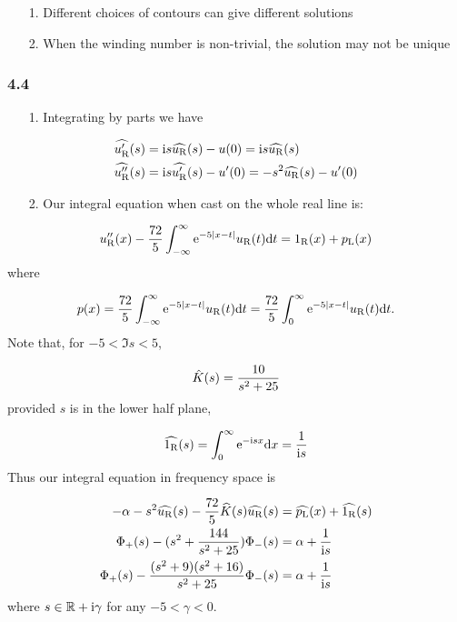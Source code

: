 \documentclass[12pt,a4paper]{article}
\def\D{ {\rm d} }
\def\I{ {\rm i} }
\def\E{ {\rm e} }
\def\R{ {\mathbb R} }
\def\dx{\D x}
\def\dt{\D t}
\def\rR{ {\rm R} }
\def\rL{ {\rm L} }
\begin{document}
\begin{itemize}
\item[1. ] Different choices of contours can give different solutions


\item[2. ] When the winding number is non-trivial, the solution may not be unique

\end{itemize}
\subsubsection{4.4}
\begin{itemize}
\item[1. ] Integrating by parts we have

\end{itemize}

\begin{align*}
\widehat{u_\rR'}(s) &= \I s \widehat{u_\rR}(s) - u(0) = \I s \widehat{u_\rR}(s) \\
\widehat{u_\rR''}(s) &= \I s \widehat{u_\rR'}(s) - u'(0)  = -s^2 \widehat{u_\rR}(s) - u'(0)
\end{align*}
\begin{itemize}
\item[2. ] Our integral equation when cast on the whole real line is:

\end{itemize}
\[
u_\rR''(x) - {72 \over 5} \int_{-\infty}^\infty \E^{-5 |x-t|} u_\rR(t)\dt = 1_\rR(x) + p_\rL(x)
\]
where 

\[
p(x) = {72 \over 5} \int_{-\infty}^\infty \E^{-5 |x-t|} u_\rR(t)\dt =  {72 \over 5} \int_0^\infty \E^{-5 |x-t|} u_\rR(t)\dt.
\]
Note that, for $-5 <\Im s < 5$,

\[
\hat K(s) = {10 \over s^2 + 25}
\]
provided $s$ is in the lower half plane,

\[
\widehat{1_\rR}(s) = \int_0^\infty \E^{-\I s x} \dx = {1 \over \I s}
\]
Thus our integral equation in frequency space is 


\begin{align*}
-\alpha - s^2 \widehat{u_\rR}(s) -  {72 \over 5} \widehat K(s) \widehat{u_\rR}(s) &=\widehat{p_\rL}(x) +  \widehat{1_\rR}(s)\\
\Phi_+(s) - (s^2 +   {144 \over s^2+25}) \Phi_-(s) &= \alpha + {1 \over \I s}\\
\Phi_+(s) -  {(s^2 + 9) (s^2+16) \over s^2+25} \Phi_-(s) &= \alpha + {1 \over \I s}
\end{align*}
where $s \in \R +\I \gamma$ for any $-5 < \gamma < 0$.
\end{document}
